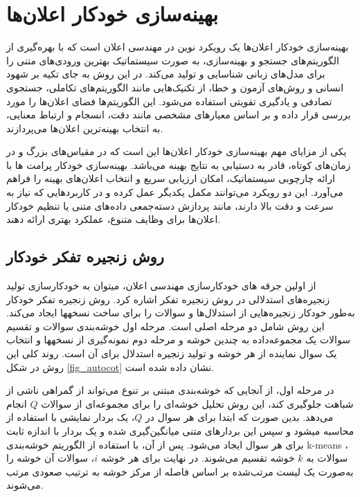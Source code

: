 \section{بهینه‌سازی خودکار اعلان‌ها}
بهینه‌سازی خودکار اعلان‌ها یک رویکرد نوین در مهندسی اعلان است که با بهره‌گیری از الگوریتم‌های جستجو و بهینه‌سازی، به صورت سیستماتیک بهترین ورودی‌های متنی را برای مدل‌های زبانی شناسایی و تولید می‌کند. در این روش به جای تکیه بر شهود انسانی و روش‌های آزمون و خطا، از تکنیک‌هایی مانند الگوریتم‌های تکاملی، جستجوی تصادفی و یادگیری تقویتی استفاده می‌شود. این الگوریتم‌ها فضای اعلان‌ها را مورد بررسی قرار داده و بر اساس معیارهای مشخصی مانند دقت، انسجام و ارتباط معنایی، به انتخاب بهینه‌ترین اعلان‌ها می‌پردازند.

یکی از مزایای مهم بهینه‌سازی خودکار اعلان‌ها این است که در مقیاس‌های بزرگ و در زمان‌های کوتاه، قادر به دستیابی به نتایج بهینه می‌باشد. بهینه‌سازی خودکار پرامت ها با ارائه چارچوبی سیستماتیک، امکان ارزیابی سریع و انتخاب اعلان‌های بهینه را فراهم می‌آورد. این دو رویکرد می‌توانند مکمل یکدیگر عمل کرده و در کاربردهایی که نیاز به سرعت و دقت بالا دارند، مانند پردازش دسته‌جمعی داده‌های متنی یا تنظیم خودکار اعلان‌ها برای وظایف متنوع، عملکرد بهتری ارائه دهند.

\subsection{روش زنجیره تفکر خودکار}
از اولین جرقه های خودکارسازی مهندسی اعلان، میتوان به خودکارسازی تولید زنجیره‌های استدلالی در روش زنجیره تفکر اشاره کرد. روش زنجیره تفکر خودکار 
 \cite{auto_cot}
 به‌طور خودکار زنجیره‌هایی از استدلال‌ها و سوالات را برای ساخت نسخهها ایجاد می‌کند. این روش شامل دو مرحله اصلی است. مرحله اول خوشه‌بندی سوالات و تقسیم سوالات یک مجموعه‌داده به چندین خوشه و مرحله دوم نمونه‌گیری از نسخهها و انتخاب یک سوال نماینده از هر خوشه و تولید زنجیره استدلال برای آن است. روند کلی این روش در شکل \ref{fig_autocot} نشان داده شده است.

در مرحله اول، از آنجایی که خوشه‌بندی مبتنی بر تنوع می‌تواند از گمراهی ناشی از شباهت جلوگیری کند، این روش تحلیل خوشه‌ای را برای مجموعه‌ای از سوالات $Q$ انجام می‌دهد. بدین صورت که ابتدا برای هر سوال در $Q$، یک بردار نمایشی با استفاده از  \cite{sentenceBert} محاسبه می\/شود و سپس این بردارهای متنی میانگین‌گیری شده و یک بردار با اندازه ثابت برای هر سوال ایجاد می‌شود. پس از آن، با استفاده از الگوریتم خوشه‌بندی k-means ، سوالات به $k$ خوشه تقسیم می‌شوند. در نهایت برای هر خوشه $i$، سوالات آن خوشه را به‌صورت یک لیست مرتب‌شده  بر اساس فاصله از مرکز خوشه به ترتیب صعودی مرتب می‌شوند.

